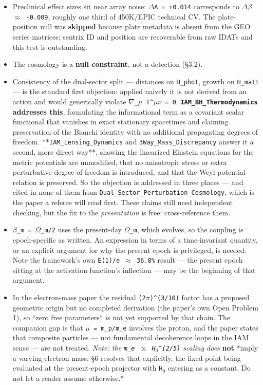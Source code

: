 \documentclass[12pt,a4paper]{article}
\begin{document}
\begin{itemize}
  \item Preclinical effect sizes sit near array noise: \texttt{$\Delta$A = +0.014} corresponds to \texttt{$\Delta\beta$ $\approx$ -0.009}, roughly one third of 450K/EPIC technical CV. The plate-position null was \textbf{skipped} because plate metadata is absent from the GEO series matrices; sentrix ID and position are recoverable from raw IDATs and this test is outstanding.
  \item The cosmology is a \textbf{null constraint}, not a detection (\S3.2).
  \item Consistency of the dual-sector split --- distances on \texttt{H\_phot}, growth on \texttt{H\_matt} --- is the standard first objection: applied naively it is not derived from an action and would generically violate \texttt{$\nabla$\_$\mu$ T\textasciicircum{}$\mu\nu$ = 0}. \textbf{\texttt{IAM\_BH\_Thermodynamics} addresses this}, formulating the informational term as a covariant scalar functional that vanishes in exact stationary spacetimes and claiming preservation of the Bianchi identity with no additional propagating degrees of freedom. **\texttt{IAM\_Lensing\_Dynamics} and \texttt{3Way\_Mass\_Discrepancy} answer it a second, more direct way**, showing the linearized Einstein equations for the metric potentials are unmodified, that no anisotropic stress or extra perturbative degree of freedom is introduced, and that the Weyl-potential relation is preserved. So the objection is addressed in three places --- and cited in none of them from \texttt{Dual\_Sector\_Perturbation\_Cosmology}, which is the paper a referee will read first. These claims still need independent checking, but the fix to the \textit{presentation} is free: cross-reference them.
  \item \texttt{$\beta$\_m = $\Omega$\_m/2} uses the present-day \texttt{$\Omega$\_m}, which evolves, so the coupling is epoch-specific as written. An expression in terms of a time-invariant quantity, or an explicit argument for why the present epoch is privileged, is needed. Note the framework's own \texttt{E(1)/e $\approx$ 36.8\%} result --- the present epoch sitting at the activation function's inflection --- may be the beginning of that argument.
  \item In the electron-mass paper the residual \texttt{(2$\pi$)\textasciicircum{}(3/10)} factor has a proposed geometric origin but no completed derivation (the paper's own Open Problem 1), so ``zero free parameters`` is not yet supported by that chain. The companion gap is that \texttt{$\mu$ = m\_p/m\_e} involves the proton, and the paper states that composite particles --- not fundamental decoherence loops in the IAM sense --- are not treated. \textit{Note: the \texttt{m\_e $\propto$ H$_{0}$\textasciicircum{}(2/5)} scaling does} \textbf{not} *imply a varying electron mass; \S6 resolves that explicitly, the fixed point being evaluated at the present-epoch projector with \texttt{H$_{0}$} entering as a constant. Do not let a reader assume otherwise.*

\end{itemize}
\end{document}
